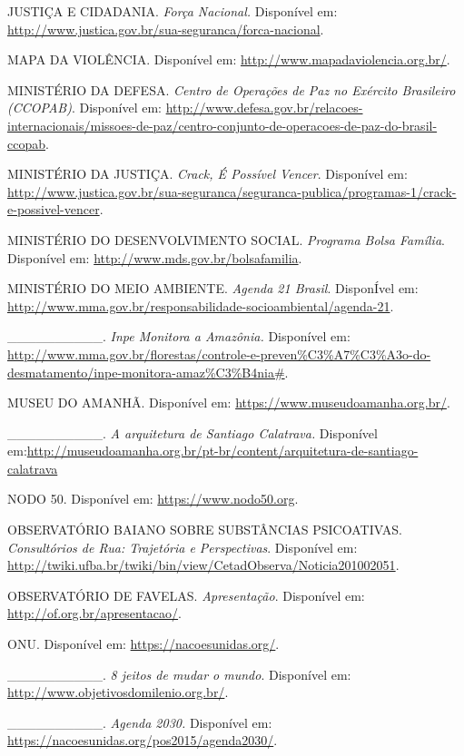 JUSTIÇA E CIDADANIA. \emph{Força Nacional.} Disponível em:
\url{http://www.justica.gov.br/sua-seguranca/forca-nacional}.

MAPA DA VIOLÊNCIA. Disponível em:
\url{http://www.mapadaviolencia.org.br/}.

MINISTÉRIO DA DEFESA. \emph{Centro de Operações de Paz no Exército
Brasileiro (CCOPAB)}. Disponível em:
\url{http://www.defesa.gov.br/relacoes-internacionais/missoes-de-paz/centro-conjunto-de-operacoes-de-paz-do-brasil-ccopab}.

MINISTÉRIO DA JUSTIÇA. \emph{Crack, É Possível Vencer}. Disponível em:
\url{http://www.justica.gov.br/sua-seguranca/seguranca-publica/programas-1/crack-e-possivel-vencer}.

MINISTÉRIO DO DESENVOLVIMENTO SOCIAL. \emph{Programa Bolsa Família}.
Disponível em:
\href{http://www.mds.gov.br/bolsafamilia}{{http://www.mds.gov.br/bolsafamilia}}.

MINISTÉRIO DO MEIO AMBIENTE. \emph{Agenda 21 Brasil}. DisponÍvel em:
\url{http://www.mma.gov.br/responsabilidade-socioambiental/agenda-21}.

\_\_\_\_\_\_\_\_\_\_. \emph{Inpe Monitora a Amazônia.} Disponível em:
\href{http://www.mma.gov.br/florestas/controle-e-preven\%C3\%A7\%C3\%A3o-do-desmatamento/inpe-monitora-amaz\%C3\%B4nia}{http://www.mma.gov.br/florestas/controle-e-preven\%C3\%A7\%C3\%A3o-do-desmatamento/inpe-monitora-amaz\%C3\%B4nia\#}.

MUSEU DO AMANHÃ. Disponível em: \url{https://www.museudoamanha.org.br/}.

\_\_\_\_\_\_\_\_\_\_. \emph{A arquitetura de Santiago Calatrava.}
Disponível
em:\url{http://museudoamanha.org.br/pt-br/content/arquitetura-de-santiago-calatrava}

NODO 50. Disponível em: \url{https://www.nodo50.org}.

OBSERVATÓRIO BAIANO SOBRE SUBSTÂNCIAS PSICOATIVAS. \emph{Consultórios de
Rua: Trajetória e Perspectivas}. Disponível em:
\url{http://twiki.ufba.br/twiki/bin/view/CetadObserva/Noticia201002051}.

OBSERVATÓRIO DE FAVELAS. \emph{Apresentação}. Disponível em:
\url{http://of.org.br/apresentacao/}.

ONU. Disponível em: \url{https://nacoesunidas.org/}.

\_\_\_\_\_\_\_\_\_\_. \emph{8 jeitos de mudar o mundo}. Disponível em:
\url{http://www.objetivosdomilenio.org.br/}.

\_\_\_\_\_\_\_\_\_\_. \emph{Agenda 2030.} Disponível em:
\url{https://nacoesunidas.org/pos2015/agenda2030/}.

